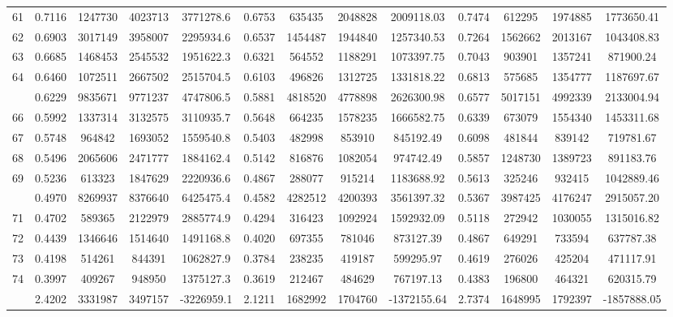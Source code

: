\documentclass[
  12pt,
]{article}
\begin{document}
\begin{longtable}[t]{lcccccccccccc}
61 & 0.7116 & 1247730 & 4023713 & 3771278.6 & 0.6753 & 635435 & 2048828 & 2009118.03 & 0.7474 & 612295 & 1974885 & 1773650.41\\
62 & 0.6903 & 3017149 & 3958007 & 2295934.6 & 0.6537 & 1454487 & 1944840 & 1257340.53 & 0.7264 & 1562662 & 2013167 & 1043408.83\\
63 & 0.6685 & 1468453 & 2545532 & 1951622.3 & 0.6321 & 564552 & 1188291 & 1073397.75 & 0.7043 & 903901 & 1357241 & 871900.24\\
64 & 0.6460 & 1072511 & 2667502 & 2515704.5 & 0.6103 & 496826 & 1312725 & 1331818.22 & 0.6813 & 575685 & 1354777 & 1187697.67\\
\addlinespace
65 & 0.6229 & 9835671 & 9771237 & 4747806.5 & 0.5881 & 4818520 & 4778898 & 2626300.98 & 0.6577 & 5017151 & 4992339 & 2133004.94\\
66 & 0.5992 & 1337314 & 3132575 & 3110935.7 & 0.5648 & 664235 & 1578235 & 1666582.75 & 0.6339 & 673079 & 1554340 & 1453311.68\\
67 & 0.5748 & 964842 & 1693052 & 1559540.8 & 0.5403 & 482998 & 853910 & 845192.49 & 0.6098 & 481844 & 839142 & 719781.67\\
68 & 0.5496 & 2065606 & 2471777 & 1884162.4 & 0.5142 & 816876 & 1082054 & 974742.49 & 0.5857 & 1248730 & 1389723 & 891183.76\\
69 & 0.5236 & 613323 & 1847629 & 2220936.6 & 0.4867 & 288077 & 915214 & 1183688.92 & 0.5613 & 325246 & 932415 & 1042889.46\\
\addlinespace
70 & 0.4970 & 8269937 & 8376640 & 6425475.4 & 0.4582 & 4282512 & 4200393 & 3561397.32 & 0.5367 & 3987425 & 4176247 & 2915057.20\\
71 & 0.4702 & 589365 & 2122979 & 2885774.9 & 0.4294 & 316423 & 1092924 & 1592932.09 & 0.5118 & 272942 & 1030055 & 1315016.82\\
72 & 0.4439 & 1346646 & 1514640 & 1491168.8 & 0.4020 & 697355 & 781046 & 873127.39 & 0.4867 & 649291 & 733594 & 637787.38\\
73 & 0.4198 & 514261 & 844391 & 1062827.9 & 0.3784 & 238235 & 419187 & 599295.97 & 0.4619 & 276026 & 425204 & 471117.91\\
74 & 0.3997 & 409267 & 948950 & 1375127.3 & 0.3619 & 212467 & 484629 & 767197.13 & 0.4383 & 196800 & 464321 & 620315.79\\
\addlinespace
75 & 2.4202 & 3331987 & 3497157 & -3226959.1 & 2.1211 & 1682992 & 1704760 & -1372155.64 & 2.7374 & 1648995 & 1792397 & -1857888.05\\*
\end{longtable}
\endgroup{}
\end{document}
